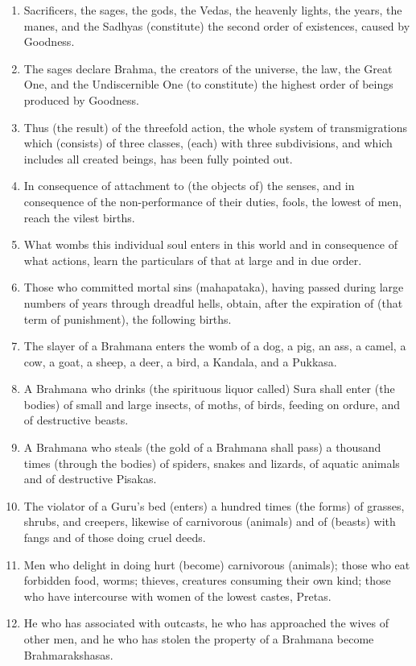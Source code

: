 \begin{enumerate}
\item Sacrificers, the sages, the gods, the Vedas, the heavenly lights, the years, the manes, and the Sadhyas (constitute) the second order of existences, caused by Goodness.
\item The sages declare Brahma, the creators of the universe, the law, the Great One, and the Undiscernible One (to constitute) the highest order of beings produced by Goodness.
\item Thus (the result) of the threefold action, the whole system of transmigrations which (consists) of three classes, (each) with three subdivisions, and which includes all created beings, has been fully pointed out.
\item In consequence of attachment to (the objects of) the senses, and in consequence of the non-performance of their duties, fools, the lowest of men, reach the vilest births.
\item What wombs this individual soul enters in this world and in consequence of what actions, learn the particulars of that at large and in due order.
\item Those who committed mortal sins (mahapataka), having passed during large numbers of years through dreadful hells, obtain, after the expiration of (that term of punishment), the following births.
\item The slayer of a Brahmana enters the womb of a dog, a pig, an ass, a camel, a cow, a goat, a sheep, a deer, a bird, a Kandala, and a Pukkasa.
\item A Brahmana who drinks (the spirituous liquor called) Sura shall enter (the bodies) of small and large insects, of moths, of birds, feeding on ordure, and of destructive beasts.
\item A Brahmana who steals (the gold of a Brahmana shall pass) a thousand times (through the bodies) of spiders, snakes and lizards, of aquatic animals and of destructive Pisakas.
\item The violator of a Guru's bed (enters) a hundred times (the forms) of grasses, shrubs, and creepers, likewise of carnivorous (animals) and of (beasts) with fangs and of those doing cruel deeds.
\item Men who delight in doing hurt (become) carnivorous (animals); those who eat forbidden food, worms; thieves, creatures consuming their own kind; those who have intercourse with women of the lowest castes, Pretas.
\item He who has associated with outcasts, he who has approached the wives of other men, and he who has stolen the property of a Brahmana become Brahmarakshasas.

\end{enumerate}
